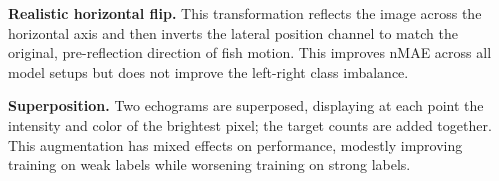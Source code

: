 \noindent
\textbf{Realistic horizontal flip.} This transformation reflects the image across the horizontal axis and then inverts the lateral position channel to match the original, pre-reflection direction of fish motion. This improves nMAE across all model setups but does not improve the left-right class imbalance.

\noindent
\textbf{Superposition.} Two echograms are superposed, displaying at each point the intensity and color of the brightest pixel; the target counts are added together. This augmentation has mixed effects on performance, modestly improving training on weak labels while worsening training on strong labels.





